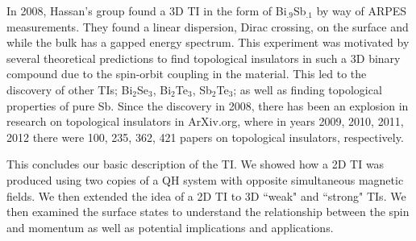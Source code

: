 In 2008, Hassan's group found a 3D TI in the form of Bi$_{.9}$Sb$_{.1}$ by way of ARPES measurements\cite{hsieh_topological_2008}. They found a linear dispersion, Dirac crossing, on the surface and while the bulk has a gapped energy spectrum. This experiment was motivated by several theoretical predictions\cite{fu_topological_2007,fu_topological_2007-1} to find topological insulators in such a 3D binary compound due to the spin-orbit coupling in the material. This led to the discovery of other TIs; Bi$_2$Se$_3$, Bi$_2$Te$_3$, Sb$_2$Te$_3$; as well as finding topological properties of pure Sb\cite{hsieh_tunable_2009,hsieh_observation_2009,hsieh_observation_2009-1,roushan_topological_2009,seo_transmission_2010}. Since the discovery in 2008, there has been an explosion in research on topological insulators in ArXiv.org, where in years 2009, 2010, 2011, 2012 there were 100, 235, 362, 421 papers on topological insulators, respectively. 
 
This concludes our basic description of the TI. We showed how a 2D TI was produced using two copies of a QH system with opposite simultaneous magnetic fields. We then extended the idea of a 2D TI to 3D ``weak" and ``strong" TIs. We then examined the surface states to understand the relationship between the spin and momentum as well as potential implications and applications.  
 
